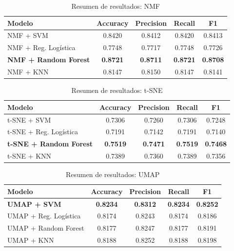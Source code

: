 \documentclass[conference]{IEEEtran}
\begin{document}
\begin{table}[H]
\centering
\caption{Resumen de resultados: NMF}
\begin{tabular}{lcccc}
\toprule
\textbf{Modelo} & \textbf{Accuracy} & \textbf{Precision} & \textbf{Recall} & \textbf{F1} \\
\midrule
NMF + SVM & 0.8420 & 0.8412 & 0.8420 & 0.8413 \\
NMF + Reg. Logística & 0.7748 & 0.7717 & 0.7748 & 0.7726 \\
\textbf{NMF + Random Forest} & \textbf{0.8721} & \textbf{0.8711} & \textbf{0.8721} & \textbf{0.8708} \\
NMF + KNN & 0.8147 & 0.8150 & 0.8147 & 0.8141 \\
\bottomrule
\end{tabular}
\label{tab:nmf}
\end{table}
\vspace{-6pt}

\begin{table}[H]
\centering
\caption{Resumen de resultados: t-SNE}
\begin{tabular}{lcccc}
\toprule
\textbf{Modelo} & \textbf{Accuracy} & \textbf{Precision} & \textbf{Recall} & \textbf{F1} \\
\midrule
t-SNE + SVM & 0.7306 & 0.7260 & 0.7306 & 0.7248 \\
t-SNE + Reg. Logística & 0.7191 & 0.7142 & 0.7191 & 0.7140 \\
\textbf{t-SNE + Random Forest} & \textbf{0.7519} & \textbf{0.7471} & \textbf{0.7519} & \textbf{0.7468} \\
t-SNE + KNN & 0.7389 & 0.7360 & 0.7389 & 0.7356 \\
\bottomrule
\end{tabular}
\label{tab:tsne}
\end{table}
\vspace{-6pt}

\begin{table}[H]
\centering
\caption{Resumen de resultados: UMAP}
\begin{tabular}{lcccc}
\toprule
\textbf{Modelo} & \textbf{Accuracy} & \textbf{Precision} & \textbf{Recall} & \textbf{F1} \\
\midrule
\textbf{UMAP + SVM} & \textbf{0.8234} & \textbf{0.8312} & \textbf{0.8234} & \textbf{0.8252} \\
UMAP + Reg. Logística & 0.8174 & 0.8243 & 0.8174 & 0.8186 \\
UMAP + Random Forest & 0.8177 & 0.8247 & 0.8177 & 0.8191 \\
UMAP + KNN & 0.8188 & 0.8252 & 0.8188 & 0.8198 \\
\bottomrule
\end{tabular}
\label{tab:umap}
\end{table}
\vspace{-6pt}
\end{document}
